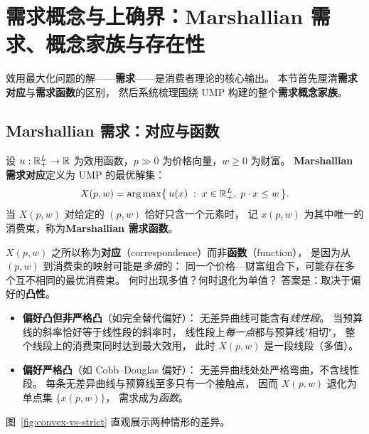 
\section{需求概念与上确界：Marshallian 需求、概念家族与存在性}
\label{sec:demand-concepts}

效用最大化问题的解——\textbf{需求}——是消费者理论的核心输出。
本节首先厘清\textbf{需求对应}与\textbf{需求函数}的区别，
然后系统梳理围绕 UMP 构建的整个\textbf{需求概念家族}。

\subsection{Marshallian 需求：对应与函数}
\label{subsec:correspondence-vs-function}

\begin{definition}\label{def:marshallian-demand}
设 $u:\mathbb{R}^L_+\to\mathbb{R}$ 为效用函数，$p\gg 0$ 为价格向量，$w\ge 0$ 为财富。
\textbf{Marshallian 需求对应}定义为 UMP 的最优解集：
\[
  X(p,w)=\arg\max\bigl\{\,u(x)\;:\;x\in\mathbb{R}^L_+,\;p\cdot x\le w\,\bigr\}.
\]
当 $X(p,w)$ 对给定的 $(p,w)$ 恰好只含一个元素时，
记 $x(p,w)$ 为其中唯一的消费束，称为\textbf{Marshallian 需求函数}。
\end{definition}

$X(p,w)$ 之所以称为\textbf{对应}（correspondence）而非\textbf{函数}（function），
是因为从 $(p,w)$ 到消费束的映射可能是\emph{多值}的：
同一个价格—财富组合下，可能存在多个互不相同的最优消费束。
何时出现多值？何时退化为单值？
答案是：取决于偏好的\textbf{凸性}。

\begin{itemize}
\item \textbf{偏好凸但非严格凸}（如完全替代偏好）：
  无差异曲线可能含有\emph{线性段}。
  当预算线的斜率恰好等于线性段的斜率时，
  线性段上\emph{每一点}都与预算线"相切"，
  整个线段上的消费束同时达到最大效用，
  此时 $X(p,w)$ 是一段线段（多值）。
\item \textbf{偏好严格凸}（如 Cobb--Douglas 偏好）：
  无差异曲线处处严格弯曲，不含线性段。
  每条无差异曲线与预算线至多只有一个接触点，
  因而 $X(p,w)$ 退化为单点集 $\{x(p,w)\}$，
  需求成为\emph{函数}。
\end{itemize}

图~\ref{fig:convex-vs-strict} 直观展示两种情形的差异。

